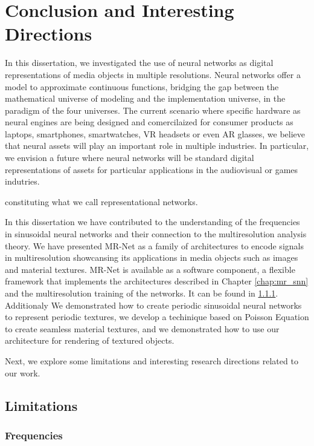 \chapter{Conclusion and Interesting Directions}
\label{chap:future}

In this dissertation, we investigated the use of neural networks as digital representations of media objects in multiple resolutions. Neural networks offer a model to approximate continuous functions, bridging the gap between the mathematical universe of modeling and the implementation universe, in the paradigm of the four universes. The current scenario where specific hardware as neural engines are being designed and comercilaized for consumer products as laptops, smartphones, smartwatches, VR headsets or even AR glasses, we believe that neural assets will play an important role in multiple industries.  In particular, we envision a future where neural networks will be standard digital representations of assets for particular applications in the audiovisual or games indutries.


constituting what we call representational networks.

In this dissertation we have contributed to the understanding of the frequencies in sinusoidal neural networks and their connection to the multiresolution analysis theory. We have presented MR-Net as a family of architectures to encode signals in multiresolution showcansing its applications in media objects such as images and material textures. MR-Net is available as a software component, a flexible framework that implements the architectures described in Chapter \ref{chap:mr_snn} and the multiresolution training of the networks. It can be found in \ref{}. Additionaly We demonstrated how to create periodic sinusoidal neural networks to represent periodic textures, we develop a techinique based on Poisson Equation to create seamless material textures, and we demonstrated how to use our architecture for rendering of textured objects.

Next, we explore some limitations and interesting research directions related to our work.

\section{Limitations}

\subsection{Frequencies}

